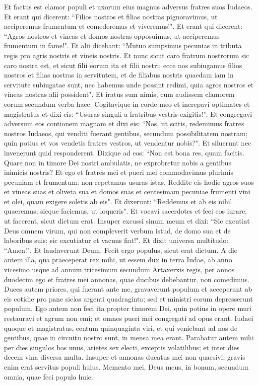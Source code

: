 \begin{biblechapter}  
\verse Et factus est clamor populi et uxorum eius magnus adversus fratres suos Iudaeos. 
\verse Et erant qui dicerent: “Filios nostros et filias nostras pignoravimus, ut acciperemus frumentum et comederemus et viveremus!". 
\verse Et erant qui dicerent: “Agros nostros et vineas et domos nostras opposuimus, ut acciperemus frumentum in fame!". 
\verse Et alii dicebant: “Mutuo sumpsimus pecunias in tributa regis pro agris nostris et vineis nostris. 
\verse Et nunc sicut caro fratrum nostrorum sic caro nostra est, et sicut filii eorum ita et filii nostri; ecce nos subiugamus filios nostros et filias nostras in servitutem, et de filiabus nostris quaedam iam in servitute subiugatae sunt, nec habemus unde possint redimi, quia agros nostros et vineas nostras alii possident". 
\verse Et iratus sum nimis, cum audissem clamorem eorum secundum verba haec. 
\verse Cogitavique in corde meo et increpavi optimates et magistratus et dixi eis: “Usuras singuli a fratribus vestris exigitis!". Et congregavi adversum eos contionem magnam 
\verse et dixi eis: “Nos, ut scitis, redemimus fratres nostros Iudaeos, qui venditi fuerant gentibus, secundum possibilitatem nostram; quin potius et vos vendetis fratres vestros, ut vendentur nobis?". Et siluerunt nec invenerunt quid responderent. 
\verse Dixique ad eos: “Non est bona res, quam facitis. Quare non in timore Dei nostri ambulatis, ne exprobretur nobis a gentibus inimicis nostris? 
\verse Et ego et fratres mei et pueri mei commodavimus plurimis pecuniam et frumentum; non repetamus usuras istas. 
\verse Reddite eis hodie agros suos et vineas suas et oliveta sua et domos suas et centesimam pecuniae frumenti vini et olei, quam exigere soletis ab eis". 
\verse Et dixerunt: “Reddemus et ab eis nihil quaeremus; sicque faciemus, ut loqueris". Et vocavi sacerdotes et feci eos iurare, ut facerent, sicut dictum erat. 
\verse Insuper excussi sinum meum et dixi: “Sic excutiat Deus omnem virum, qui non compleverit verbum istud, de domo sua et de laboribus suis; sic excutiatur et vacuus fiat!". Et dixit universa multitudo: “Amen!". Et laudaverunt Deum. Fecit ergo populus, sicut erat dictum. 
\verse A die autem illa, qua praeceperat rex mihi, ut essem dux in terra Iudae, ab anno vicesimo usque ad annum tricesimum secundum Artaxerxis regis, per annos duodecim ego et fratres mei annonas, quae ducibus debebantur, non comedimus.  
\verse Duces autem priores, qui fuerant ante me, gravaverunt populum et acceperunt ab eis cotidie pro pane siclos argenti quadraginta; sed et ministri eorum depresserunt populum. Ego autem non feci ita propter timorem Dei, 
\verse quin potius in opere muri restauravi et agrum non emi; et omnes pueri mei congregati ad opus erant. 
\verse Iudaei quoque et magistratus, centum quinquaginta viri, et qui veniebant ad nos de gentibus, quae in circuitu nostro sunt, in mensa mea erant. 
\verse Parabatur autem mihi per dies singulos bos unus, arietes sex electi, exceptis volatilibus; et inter dies decem vina diversa multa. Insuper et annonas ducatus mei non quaesivi; gravis enim erat servitus populi huius. 
\verse Memento mei, Deus meus, in bonum, secundum omnia, quae feci populo huic. 
\end{biblechapter}

